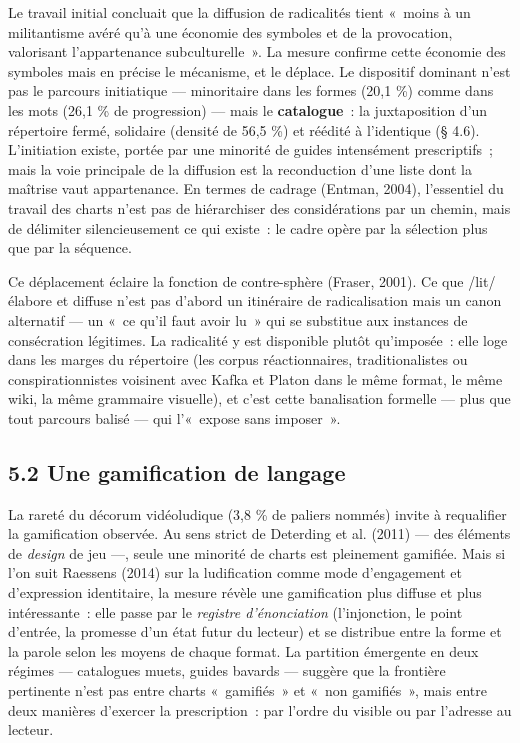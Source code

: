 \documentclass[11pt,a4paper]{article}
\begin{document}
Le travail initial concluait que la diffusion de radicalités tient «~moins à un militantisme avéré qu'à une économie des symboles et de la provocation, valorisant l'appartenance subculturelle~». La mesure confirme cette économie des symboles mais en précise le mécanisme, et le déplace. Le dispositif dominant n'est pas le parcours initiatique --- minoritaire dans les formes (20,1 \%) comme dans les mots (26,1 \% de progression) --- mais le \textbf{catalogue}~: la juxtaposition d'un répertoire fermé, solidaire (densité de 56,5 \%) et réédité à l'identique (§ 4.6). L'initiation existe, portée par une minorité de guides intensément prescriptifs~; mais la voie principale de la diffusion est la reconduction d'une liste dont la maîtrise vaut appartenance. En termes de cadrage (Entman, 2004), l'essentiel du travail des charts n'est pas de hiérarchiser des considérations par un chemin, mais de délimiter silencieusement ce qui existe~: le cadre opère par la sélection plus que par la séquence.

Ce déplacement éclaire la fonction de contre-sphère (Fraser, 2001). Ce que /lit/ élabore et diffuse n'est pas d'abord un itinéraire de radicalisation mais un canon alternatif --- un «~ce qu'il faut avoir lu~» qui se substitue aux instances de consécration légitimes. La radicalité y est disponible plutôt qu'imposée~: elle loge dans les marges du répertoire (les corpus réactionnaires, traditionalistes ou conspirationnistes voisinent avec Kafka et Platon dans le même format, le même wiki, la même grammaire visuelle), et c'est cette banalisation formelle --- plus que tout parcours balisé --- qui l'«~expose sans imposer~».

\subsection*{5.2 Une gamification de langage}

La rareté du décorum vidéoludique (3,8 \% de paliers nommés) invite à requalifier la gamification observée. Au sens strict de Deterding et al. (2011) --- des éléments de \emph{design} de jeu ---, seule une minorité de charts est pleinement gamifiée. Mais si l'on suit Raessens (2014) sur la ludification comme mode d'engagement et d'expression identitaire, la mesure révèle une gamification plus diffuse et plus intéressante~: elle passe par le \emph{registre d'énonciation} (l'injonction, le point d'entrée, la promesse d'un état futur du lecteur) et se distribue entre la forme et la parole selon les moyens de chaque format. La partition émergente en deux régimes --- catalogues muets, guides bavards --- suggère que la frontière pertinente n'est pas entre charts «~gamifiés~» et «~non gamifiés~», mais entre deux manières d'exercer la prescription~: par l'ordre du visible ou par l'adresse au lecteur.
\end{document}
